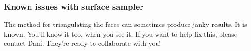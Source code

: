 \subsubsection{Known issues with surface sampler}

The method for triangulating the faces can sometimes produce janky results.  It is known.   You'll know it too, when you see it.  If you want to help fix this, please contact Dani.  They're ready to collaborate with you!

